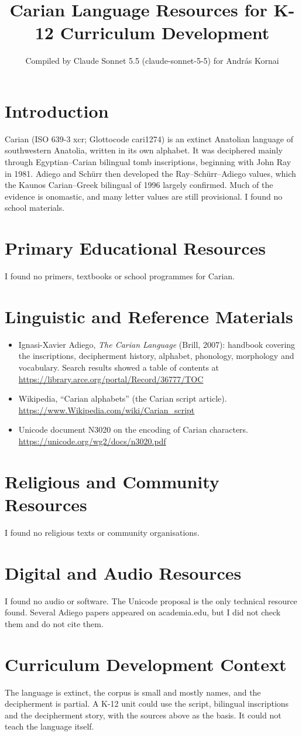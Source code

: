 \documentclass[12pt]{article}
\title{Carian Language Resources for K-12 Curriculum Development}
\author{Compiled by Claude Sonnet 5.5 (claude-sonnet-5-5) for Andr\'as Kornai}
\date{}
\begin{document}
\maketitle

\section{Introduction}
Carian (ISO 639-3 xcr; Glottocode cari1274) is an extinct Anatolian language of southwestern Anatolia, written in its own alphabet. It was deciphered mainly through Egyptian--Carian bilingual tomb inscriptions, beginning with John Ray in 1981. Adiego and Schürr then developed the Ray--Schürr--Adiego values, which the Kaunos Carian--Greek bilingual of 1996 largely confirmed. Much of the evidence is onomastic, and many letter values are still provisional. I found no school materials.

\section{Primary Educational Resources}
I found no primers, textbooks or school programmes for Carian.

\section{Linguistic and Reference Materials}
\begin{itemize}
\item Ignasi-Xavier Adiego, \emph{The Carian Language} (Brill, 2007): handbook covering the inscriptions, decipherment history, alphabet, phonology, morphology and vocabulary. Search results showed a table of contents at \url{https://library.arce.org/portal/Record/36777/TOC}
\item Wikipedia, ``Carian alphabets'' (the Carian script article). \url{https://www.Wikipedia.com/wiki/Carian_script}
\item Unicode document N3020 on the encoding of Carian characters. \url{https://unicode.org/wg2/docs/n3020.pdf}
\end{itemize}

\section{Religious and Community Resources}
I found no religious texts or community organisations.

\section{Digital and Audio Resources}
I found no audio or software. The Unicode proposal is the only technical resource found. Several Adiego papers appeared on academia.edu, but I did not check them and do not cite them.

\section{Curriculum Development Context}
The language is extinct, the corpus is small and mostly names, and the decipherment is partial. A K-12 unit could use the script, bilingual inscriptions and the decipherment story, with the sources above as the basis. It could not teach the language itself.
\end{document}
